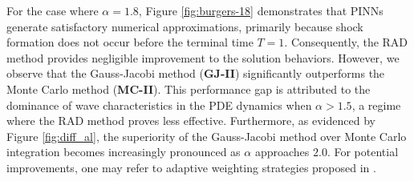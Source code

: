 \documentclass[preprint,3p,times]{elsarticle}
\begin{document}
For the case where $\alpha=1.8$, Figure \ref{fig:burgers-18} demonstrates that PINNs generate satisfactory numerical approximations, primarily because shock formation does not occur before the terminal time $T=1$. Consequently, the RAD method provides negligible improvement to the solution behaviors. However, we observe that the Gauss-Jacobi method (\textbf{GJ-II}) significantly outperforms the Monte Carlo method (\textbf{MC-II}). This performance gap is attributed to the dominance of wave characteristics in the PDE dynamics when $\alpha > 1.5$, a regime where the RAD method proves less effective. Furthermore, as evidenced by Figure \ref{fig:diff_al}, the superiority of the Gauss-Jacobi method over Monte Carlo integration becomes increasingly pronounced as $\alpha$ approaches $2.0$. For potential improvements, one may refer to adaptive weighting strategies proposed in \cite{WangParis:2021:SISC,Wang2022:causality}.
\end{document}
